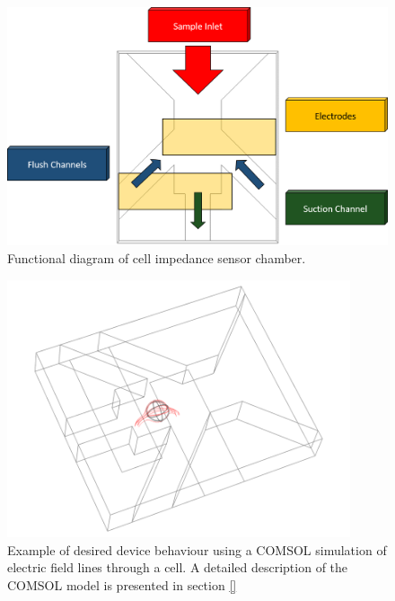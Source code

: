 \begin{figure}[h]
    \centering
    \includegraphics[width=\textwidth]{images/josh_steph_design.png}
    \caption{Functional diagram of cell impedance sensor chamber.}
    \label{fig:josh-steph_functional_diagram}
\end{figure}


\begin{figure}[h]
    \centering
    \includegraphics[width=0.9\textwidth]{images/josh_steph_sim.png}
    \caption{Example of desired device behaviour using a COMSOL simulation of electric field lines through a cell. A detailed description of the COMSOL model is presented in section \ref{}}
    \label{fig:josh-steph_sim}
\end{figure}


